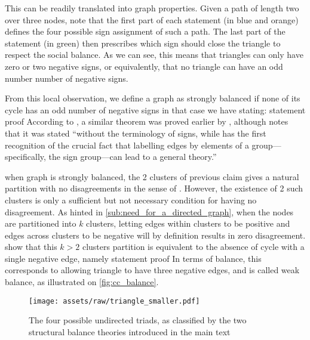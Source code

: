 This can be readily translated into graph properties. Given a path of length two over three nodes,
note that the first part of each statement (in blue and orange) defines the four possible sign
assignment of such a path. The last part of the statement (in green) then prescribes which sign
should close the triangle to respect the social balance. As we can see, this means that triangles can
only have zero or two negative signs, or equivalently, that no triangle can have an odd number
number of negative signs.

From this local observation, we define a graph as strongly balanced if none of its cycle has an odd
number of negative signs
in that case we have \textcite[Theorem 3]{harary1953} stating:
statement
proof
According to \textcite{Huffner2010}, a similar theorem was proved earlier by \textcite[Theorem
X.11]{Konig36}, although \textcite{Zaslavsky2012} notes that it was stated \enquote{without the
	terminology of signs, while \autocite{harary1953}
has the first recognition of the crucial fact that labelling edges by elements of a
group---specifically, the sign group---can lead to a general theory.}

when graph is strongly balanced, the 2 clusters of previous claim gives a natural partition with no
disagreements in the sense of \pcc{}. However, the existence of 2 such clusters is only a sufficient
but not necessary condition for having no disagreement. As hinted in
\autoref{sub:need_for_a_directed_graph}, when the nodes are partitioned into $k$ clusters, letting
edges within clusters to be positive and edges across clusters to be negative will by definition
results in zero disagreement. \Textcite{davis1967clustering} show that this $k>2$ clusters partition
is equivalent to the absence of cycle with a single negative edge, namely
statement
proof
In terms of balance, this corresponds to allowing triangle to have three negative edges, and is called
weak balance, as illustrated on \autoref{fig:cc_balance}.

\begin{figure}[htpb]
	\centering
	\texttt{[image: assets/raw/triangle\_smaller.pdf]}
	\caption{The four possible undirected triads, as classified by the two structural balance theories
	introduced in the main text} \label{fig:cc_balance}
\end{figure}

